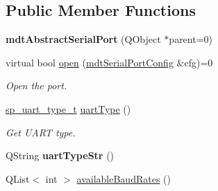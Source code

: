 \subsection*{Public Member Functions}
\begin{DoxyCompactItemize}
\item 
\hypertarget{classmdt_abstract_serial_port_ae379b6151edebc1518e81ec061e379db}{
{\bfseries mdtAbstractSerialPort} (QObject $\ast$parent=0)}
\label{classmdt_abstract_serial_port_ae379b6151edebc1518e81ec061e379db}

\item 
virtual bool \hyperlink{classmdt_abstract_serial_port_ad96a99c370c87d7e4a8b47f98cc7ce35}{open} (\hyperlink{classmdt_serial_port_config}{mdtSerialPortConfig} \&cfg)=0
\begin{DoxyCompactList}\small\item\em Open the port. \end{DoxyCompactList}\item 
\hypertarget{classmdt_abstract_serial_port_a6b153155d9e110336d51ec48d2cee203}{
\hyperlink{classmdt_abstract_serial_port_a56b107c57fb0acb17cfcca262abe6a54}{sp\_\-uart\_\-type\_\-t} \hyperlink{classmdt_abstract_serial_port_a6b153155d9e110336d51ec48d2cee203}{uartType} ()}
\label{classmdt_abstract_serial_port_a6b153155d9e110336d51ec48d2cee203}

\begin{DoxyCompactList}\small\item\em Get UART type. \end{DoxyCompactList}\item 
\hypertarget{classmdt_abstract_serial_port_a669c9ce68455abd3cfdb98259996e701}{
QString {\bfseries uartTypeStr} ()}
\label{classmdt_abstract_serial_port_a669c9ce68455abd3cfdb98259996e701}

\item 
\hypertarget{classmdt_abstract_serial_port_aad267d53be10917396302912af28c4e2}{
QList$<$ int $>$ \hyperlink{classmdt_abstract_serial_port_aad267d53be10917396302912af28c4e2}{availableBaudRates} ()}
\label{classmdt_abstract_serial_port_aad267d53be10917396302912af28c4e2}


\end{DoxyCompactItemize}
